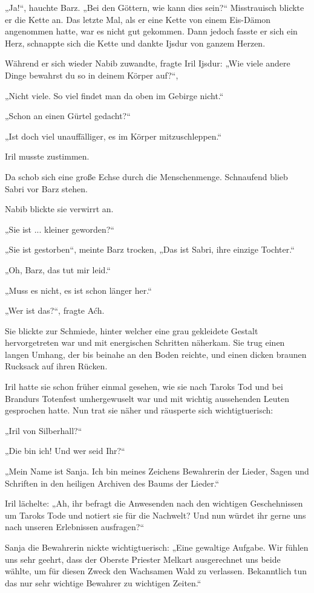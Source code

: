 „Ja!“, hauchte Barz. „Bei den Göttern, wie kann dies sein?“ Misstrauisch blickte er die Kette an. Das letzte Mal, als er eine Kette von einem Eis-Dämon angenommen hatte, war es nicht gut gekommen. Dann jedoch fasste er sich ein Herz, schnappte sich die Kette und dankte Ijsdur von ganzem Herzen.

Während er sich wieder Nabib zuwandte, fragte Iril Ijsdur: „Wie viele andere Dinge bewahrst du so in deinem Körper auf?“,

„Nicht viele. So viel findet man da oben im Gebirge nicht.“

„Schon an einen Gürtel gedacht?“

„Ist doch viel unauffälliger, es im Körper mitzuschleppen.“

Iril musste zustimmen.

Da schob sich eine große Echse durch die Menschenmenge. Schnaufend blieb Sabri vor Barz stehen.

Nabib blickte sie verwirrt an.

„Sie ist ... kleiner geworden?“

„Sie ist gestorben“, meinte Barz trocken, „Das ist Sabri, ihre einzige Tochter.“

„Oh, Barz, das tut mir leid.“

„Muss es nicht, es ist schon länger her.“

„Wer ist das?“, fragte Aćh.

Sie blickte zur Schmiede, hinter welcher eine grau gekleidete Gestalt hervorgetreten war und mit energischen Schritten näherkam. Sie trug einen langen Umhang, der bis beinahe an den Boden reichte, und einen dicken braunen Rucksack auf ihren Rücken.

Iril hatte sie schon früher einmal gesehen, wie sie nach Taroks Tod und bei Brandurs Totenfest umhergewuselt war und mit wichtig aussehenden Leuten gesprochen hatte. Nun trat sie näher und räusperte sich wichtigtuerisch:

„Iril von Silberhall?“

„Die bin ich! Und wer seid Ihr?“

„Mein Name ist Sanja. Ich bin meines Zeichens Bewahrerin der Lieder, Sagen und Schriften in den heiligen Archiven des Baums der Lieder.“

Iril lächelte: „Ah, ihr befragt die Anwesenden nach den wichtigen Geschehnissen um Taroks Tode und notiert sie für die Nachwelt? Und nun würdet ihr gerne uns nach unseren Erlebnissen ausfragen?“

Sanja die Bewahrerin nickte wichtigtuerisch: „Eine gewaltige Aufgabe. Wir fühlen uns sehr geehrt, dass der Oberste Priester Melkart ausgerechnet uns beide wählte, um für diesen Zweck den Wachsamen Wald zu verlassen. Bekanntlich tun das nur sehr wichtige Bewahrer zu wichtigen Zeiten.“

